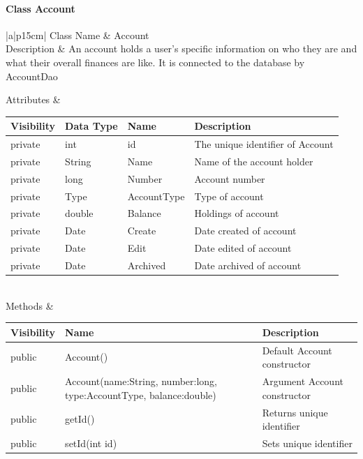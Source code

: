 \documentclass[12pt]{article}
\begin{document}
\paragraph{Class Account}
\begin{table}[H]
	\begin{tabular}{|a|p{15cm}|}
		\hline
		{Class Name} & {Account} \\
		\hline
		Description & An account holds a user's specific information on who they are and what their overall finances are like. 
		It is connected to the database by AccountDao\\
		\hline
		
		Attributes & 
		\begin{tabular}{| p{2cm} | p{2cm} | p{3cm} | p{6.45cm} |}
			\hline
			\rowcolor{lightgray}
			Visibility & Data Type & Name & Description \\
			\hline
			\rowcolor{white}
			private & int & id  & The unique identifier of Account \\
			\hline
			private & String & Name  & Name of the account holder \\
			\hline
			private & long & Number  & Account number \\
			\hline
			private & Type & AccountType  & Type of account \\
			\hline
			private & double & Balance  & Holdings of account \\
			\hline
			private & Date & Create  & Date created of account \\
			\hline
			private & Date & Edit  & Date edited of account \\
			\hline
			private & Date & Archived  & Date archived of account  \\
			\hline
		\end{tabular} \\
		\hline
		Methods & 		 
		\begin{tabular}{| p{2cm} | p{5cm} | p{6.9cm} |}
			\hline
			\rowcolor{gray}
			{Visibility} &{Name} & {Description} \\
			\hline
			\rowcolor{white}			
			public & Account() & Default Account constructor\\
			\hline
			public &  Account(name:String, number:long, type:AccountType, balance:double) & Argument Account constructor\\
			\hline
			public &  getId() & Returns unique identifier\\
			\hline
			public &  setId(int id) & Sets unique identifier\\

\end{tabular}
\end{tabular}
\end{table}
\end{document}

